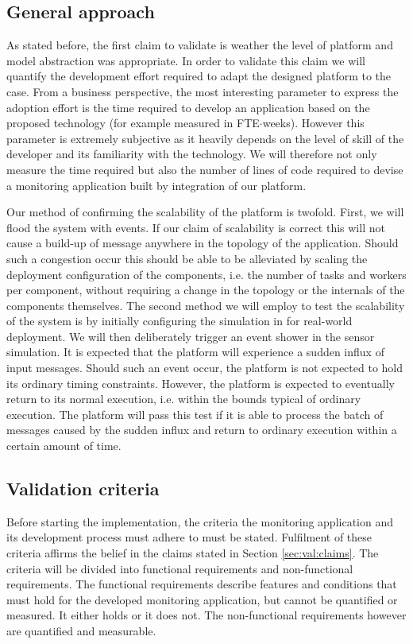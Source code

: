 \subsection{General approach} 
As stated before, the first claim to validate is weather the level of platform and model abstraction was appropriate. In order to validate this claim we will quantify the development effort required to adapt the designed platform to the case. From a business perspective, the most interesting parameter to express the adoption effort is the time required to develop an application based on the proposed technology (for example measured in FTE$\cdot$weeks). However this parameter is extremely subjective as it heavily depends on the level of skill of the developer and its familiarity with the technology. We will therefore not only measure the time required but also the number of lines of code required to devise a monitoring application built by integration of our platform. 

Our method of confirming the scalability of the platform is twofold. First, we will flood the system with events. If our claim of scalability is correct this will not cause a build-up of message anywhere in the topology of the application. Should such a congestion occur this should be able to be alleviated by scaling the deployment configuration of the components, i.e. the number of tasks and workers per component, without requiring a change in the topology or the internals of the components themselves. The second method we will employ to test the scalability of the system is by initially configuring the simulation in for real-world deployment. We will then deliberately trigger an event shower in the sensor simulation. It is expected that the platform will experience a sudden influx of input messages. Should such an event occur, the platform is not expected to hold its ordinary timing constraints. However, the platform is expected to eventually return to its normal execution, i.e. within the bounds typical of ordinary execution. The platform will pass this test if it is able to process the batch of messages caused by the sudden influx and return to ordinary execution within a certain amount of time.

\subsection{Validation criteria}
Before starting the implementation, the criteria the monitoring application and its development process must adhere to must be stated. Fulfilment of these criteria affirms the belief in the claims stated in Section \ref{sec:val:claims}. The criteria will be divided into functional requirements and non-functional requirements. The functional requirements describe features and conditions that must hold for the developed monitoring application, but cannot be quantified or measured. It either holds or it does not. The non-functional requirements however are quantified and measurable.

